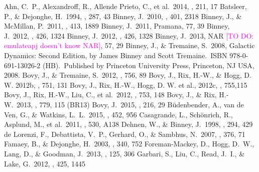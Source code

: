 \documentclass[iop,revtex4]{emulateapj}
\newcommand{\Wilma}[1]{\textcolor{Fuchsia}{#1}}
\begin{document}
%
\begin{thebibliography}{}
 Ahn, C.~P., Alexandroff, R., Allende Prieto, C., et al.\ 2014, \apjs, 211, 17 
 Batsleer, P., \& Dejonghe, H.\ 1994, \aap, 287, 43
 Binney, J.\ 2010, \mnras, 401, 2318
 Binney, J., \& McMillan, P.\ 2011, \mnras, 413, 1889
 Binney, J.\ 2011, Pramana, 77, 39
 Binney, J.\ 2012, \mnras, 426, 1324
 Binney, J.\ 2012, \mnras, 426, 1328
 Binney, J.\ 2013, NAR \Wilma{[TO DO: emulateapj doesn't know NAR]}, 57, 29 
 Binney, J., \& Tremaine, S.\ 2008, Galactic Dynamics: Second Edition, by James Binney and Scott Tremaine.~ISBN 978-0-691-13026-2 (HB).~Published by Princeton University Press, Princeton, NJ USA, 2008.
 Bovy, J., \& Tremaine, S.\ 2012, \apj, 756, 89
 Bovy, J., Rix, H.-W., \& Hogg, D. W. 2012b, \apj, 751, 131
 Bovy, J., Rix, H.-W., Hogg, D. W. et al., 2012c, \apj, 755,115
 Bovy, J., Rix, H.-W., Liu, C., et al.\ 2012, \apj, 753, 148
 Bovy, J., \& Rix, H.-W.\ 2013, \apj, 779, 115 (BR13)
 Bovy, J.\ 2015, \apjs, 216, 29 %
 B{\"u}denbender, A., van de Ven, G., \& Watkins, L.~L.\ 2015, \mnras, 452, 956 
 Casagrande, L., Sch{\"o}nrich, R., Asplund, M., et al.\ 2011, \aap, 530, A138 
 Dehnen, W., \& Binney, J.\ 1998, \mnras, 294, 429 
 de Lorenzi, F., Debattista, V.~P., Gerhard, O., \& Sambhus, N.\ 2007, \mnras, 376, 71 
 Famaey, B., \& Dejonghe, H.\ 2003, \mnras, 340, 752 
 Foreman-Mackey, D., Hogg, D.~W., Lang, D., \& Goodman, J.\ 2013, \pasp, 125, 306
 Garbari, S., Liu, C., Read, J.~I., \& Lake, G.\ 2012, \mnras, 425, 1445 

\end{thebibliography}
\end{document}
